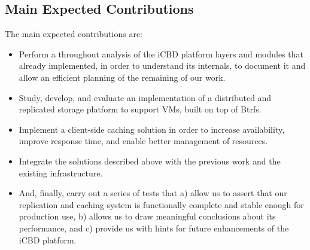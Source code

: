 


\subsection{Main Expected Contributions} %
\label{sub:intro_main_expected_contributions}

The main expected contributions are: 

\begin{itemize}
  \item Perform a throughout analysis of the iCBD platform layers and modules that already implemented, in order to understand its internals, to document it and allow an efficient planning of the remaining of our work. 
  \item Study, develop, and evaluate an implementation of a distributed and replicated storage platform to support VMs, built on top of Btrfs.
  \item Implement a client-side caching solution in order to increase availability, improve response time, and enable better management of resources.
  \item Integrate the solutions described above with the previous work and the existing infrastructure.
  \item And, finally, carry out a series of tests that a) allow us to assert that our replication and caching system is functionally complete and stable enough for production use, b) allows us to draw meaningful conclusions about its performance, and c) provide us with hints for future enhancements of the iCBD platform.
\end{itemize}




